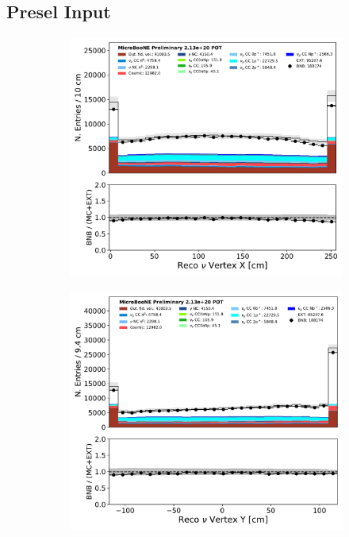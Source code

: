 \subsection{Presel Input}
\label{ssec:Appendix:numu:preselinput}
\begin{figure}[H]
    \centering
        \begin{subfigure}[b]{0.3\textwidth}
        \centering
        \includegraphics[width=\textwidth]{NuMuCCsel/Images/Ryan/appendix_presel_input_R3/reco_nu_vtx_sce_x_07262020_samples_event_category.pdf}
        \end{subfigure}
        \begin{subfigure}[b]{0.3\textwidth}
        \centering
        \includegraphics[width=\textwidth]{NuMuCCsel/Images/Ryan/appendix_presel_input_R3/reco_nu_vtx_sce_y_07262020_samples_event_category.pdf}

\end{subfigure}
\end{figure}
